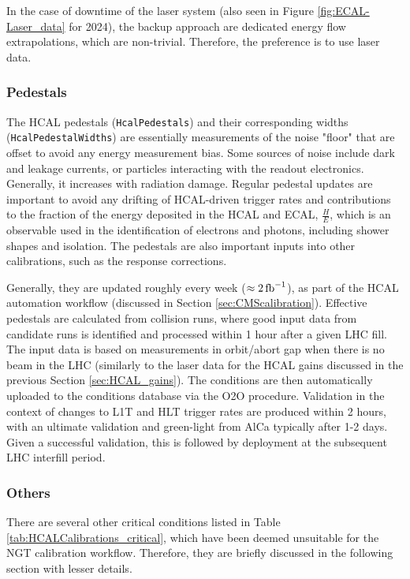 In the case of downtime of the laser system (also seen in Figure \ref{fig:ECAL-Laser_data} for 2024), the backup approach are dedicated energy flow extrapolations, which are non-trivial. Therefore, the preference is to use laser data.

\subsubsection{Pedestals}\label{sec:HCAL_pedestals}
The HCAL pedestals (\texttt{HcalPedestals}) and their corresponding widths (\texttt{HcalPedestalWidths}) are essentially measurements of the noise "floor" that are offset to avoid any energy measurement bias. Some sources of noise include dark and leakage currents, or particles interacting with the readout electronics. Generally, it increases with radiation damage. Regular pedestal updates are important to avoid any drifting of HCAL-driven trigger rates and contributions to the fraction of the energy deposited in the HCAL and ECAL, $\frac{H}{E}$, which is an observable used in the identification of electrons and photons, including shower shapes and isolation. The pedestals are also important inputs into other calibrations, such as the response corrections.

Generally, they are updated roughly every week ($\approx 2 \mbox{\ensuremath{\,\text{fb}^{-1}}}$), as part of the HCAL automation workflow (discussed in Section \ref{sec:CMScalibration}). Effective pedestals are calculated from collision runs, where good input data from candidate runs is identified and processed within 1 hour after a given LHC fill. The input data is based on measurements in orbit/abort gap when there is no beam in the LHC (similarly to the laser data for the HCAL gains discussed in the previous Section \ref{sec:HCAL_gains}). The conditions are then automatically uploaded to the conditions database via the O2O procedure. Validation in the context of changes to L1T and HLT trigger rates are produced within 2 hours, with an ultimate validation and green-light from AlCa typically after 1-2 days. Given a successful validation, this is followed by deployment at the subsequent LHC interfill period.

\subsubsection{Others}

There are several other critical conditions listed in Table \ref{tab:HCALCalibrations_critical}, which have been deemed unsuitable for the NGT calibration workflow. Therefore, they are briefly discussed in the following section with lesser details.

